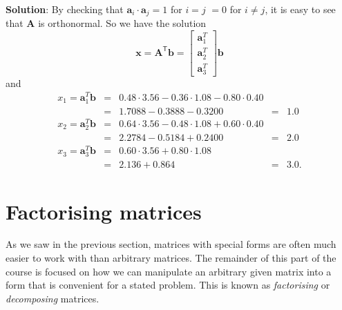{\bf Solution}:  By checking that $\mathbf a_i \cdot \mathbf a_j = 1$ for $i = j$ $=0$ for $i \neq j$,  it is easy to see that $\mathbf A$ is orthonormal.  So we have the solution 
\[
\mathbf{x}=\mathbf{A}^\mathsf{T}\mathbf{b}  = \left[\begin{array}{r}\mathbf a_1^T\\\mathbf a_2^T\\\mathbf a_3^T\end{array}\right] \mathbf{b}
\]
and
\[
\begin{array}{lllll}
x_1 =  \mathbf a_1^T \mathbf b & = & 0.48 \cdot 3.56 - 0.36 \cdot 1.08 - 0.80 \cdot 0.40\\
       & = & 1.7088 - 0.3888 - 0.3200 &= &1.0 \\
x_2 =  \mathbf a_2^T \mathbf b & = & 0.64 \cdot 3.56 - 0.48\cdot 1.08 + 0.60 \cdot 0.40\\
       &= & 2.2784 - 0.5184 + 0.2400 &= &2.0 \\
x_3 =  \mathbf a_3^T \mathbf b & = & 0.60 \cdot 3.56 + 0.80\cdot 1.08 \\
        &= & 2.136 + 0.864 &= &3.0.
\end{array} 
\] \sqend



\section{Factorising matrices}

As we saw in the previous section, matrices with special forms are often much easier to work with than arbitrary matrices.  The remainder of  this part of the course is  focused on how we can manipulate an arbitrary given matrix into a form that is convenient for a stated problem.  This is known as {\em factorising} or {\em decomposing} matrices. 

